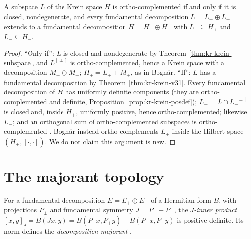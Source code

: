 \begin{theorem}
  \label{thm:kr-krein-v35}
  \leanok
  A subspace $L$ of the Krein space $H$ is ortho-complemented if and only if it is closed,
  nondegenerate, and every fundamental decomposition $L = L_+ \oplus L_-$ extends to a
  fundamental decomposition $H = H_+ \oplus H_-$ with $L_+ \subseteq H_+$ and $L_- \subseteq H_-$.
\end{theorem}

\begin{proof}
  \leanok
  ``Only if'': $L$ is closed and nondegenerate by Theorem~\ref{thm:kr-krein-subspace}, and
  $L^{[\perp]}$ is ortho-complemented, hence a Krein space with a decomposition
  $M_+ \oplus M_-$; $H_\pm = L_\pm + M_\pm$, as in Bognár. ``If'': $L$ has a fundamental
  decomposition by Theorem~\ref{thm:kr-krein-v31}. Every fundamental decomposition of $H$ has
  uniformly definite components (they are ortho-complemented and definite,
  Proposition~\ref{prop:kr-krein-posdef}); $L_+ = L \cap L_-^{[\perp]}$ is closed and, inside
  $H_+$, uniformly positive, hence ortho-complemented; likewise $L_-$; and an orthogonal sum of
  ortho-complemented subspaces is ortho-complemented \cite[Lemma~I.9.2]{Bog74}. Bognár instead
  ortho-complements $L_+$ inside the Hilbert space $(H_+, [\cdot, \cdot])$. We do not claim this
  argument is new.
\end{proof}

\section{The majorant topology}

\begin{definition}
  \label{def:kr-jinner}
  \leanok
  For a fundamental decomposition $E = E_+ \oplus E_-$ of a Hermitian form $B$, with projections
  $P_\pm$ and fundamental symmetry $J = P_+ - P_-$, the \emph{$J$-inner product}
  $[x, y]_J = B(Jx, y) = B(P_+ x, P_+ y) - B(P_- x, P_- y)$ is positive definite. Its norm defines
  the \emph{decomposition majorant} \cite[\S IV.5--6]{Bog74}.
\end{definition}

